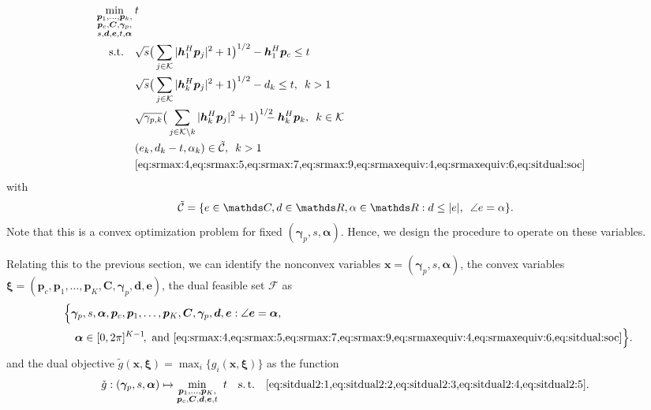 \documentclass[a4paper,10pt,journal]{IEEEtran}
\let\vec\bm
\begin{document}
\begin{subequations} \label{eq:sitdual2}
	\begin{align}
		\min_{\mathclap{\substack{\vec p_1, \dots, \vec p_k,\\\vec p_c,  \vec C, \vec \gamma_p,\\ s, \vec d, \vec e, t, \vec\alpha}}}\quad & t \\
	\mbox{s.t.}\quad
%
	& \sqrt{s} \big( \sum\limits_{j\in\mathcal{K}}|\vec{h}_{1}^{H}\vec{p}_{j}|^2+1 \big)^{1/2} - {\vec{h}}_{1}^{H}\vec{p}_{c} \le t \label{eq:sitdual2:1}\\
	& \sqrt{s} \big( \sum\limits_{j\in\mathcal{K}}|\vec{h}_{k}^{H}\vec{p}_{j}|^2+1 \big)^{1/2} - d_k \le t,\enskip k > 1 \label{eq:sitdual2:2}\\
	& \sqrt{\gamma_{p,k}} \big( \sum\limits_{j\in\mathcal{K}\setminus k}|\vec{h}_{k}^{H}\vec{p}_{j}|^2+1 \big)^{1/2}\!\!\!\!\! - {\vec{h}}_{k}^{H}\vec{p}_{k},\enskip k\in\mathcal K \label{eq:sitdual2:3}\\
	& (e_k, d_k - t, \alpha_k)\in\tilde{\mathcal C},\enskip k > 1 \label{eq:sitdual2:4} \\
	& \text{\cref{eq:srmax:4,eq:srmax:5,eq:srmax:7,eq:srmax:9,eq:srmaxequiv:4,eq:srmaxequiv:6,eq:sitdual:soc}} \label{eq:sitdual2:5}
	\end{align}
\end{subequations}
with
\begin{equation}
	\tilde{\mathcal C} = \{ e\in\mathds C, d \in \mathds R, \alpha \in\mathds R : d  \le | e |,\enskip \angle e = \alpha \}.
\end{equation}
Note that this is a convex optimization problem for fixed $(\vec\gamma_p, s, \vec\alpha)$. Hence, we design the  procedure to operate on these variables.

Relating this to the previous section, we can identify the nonconvex variables $\vec x = (\vec\gamma_p, s, \vec\alpha)$, the convex variables $\vec\xi = (\vec p_c, \vec p_1, \dots, \vec p_K, \vec C, \vec\gamma_p, \vec d, \vec e)$, the dual feasible set $\mathcal F$ as
\begin{equation} \label{eq:sitf}
	\begin{aligned}
	&\Big\{ \vec\gamma_p, s, \vec \alpha, \vec p_c, \vec p_1, \dots, \vec p_K, \vec C, \vec\gamma_p, \vec d, \vec e :
		\angle\vec e = \vec\alpha,\\
	&	\quad\vec\alpha\in[0, 2\pi]^{K-1}\!,
	\text{ and \cref{eq:srmax:4,eq:srmax:5,eq:srmax:7,eq:srmax:9,eq:srmaxequiv:4,eq:srmaxequiv:6,eq:sitdual:soc}} \mathrlap{\Big\}.}\enskip
	\end{aligned}
\end{equation}
and the dual objective $\tilde g(\vec x, \vec\xi) = \max_i\{ g_i(\vec x, \vec\xi) \}$ as the function
\begin{equation} \label{eq:sitg}
		\tilde g : (\vec\gamma_p, s, \vec\alpha) \mapsto \min_{\substack{\vec p_1, \dots, \vec p_K,\\ \vec p_c, \vec C, \vec d, \vec e, t}}\  t
		\quad\mathrm{s.\,t.}\quad
		\text{\cref{eq:sitdual2:1,eq:sitdual2:2,eq:sitdual2:3,eq:sitdual2:4,eq:sitdual2:5}}.
\end{equation}
\end{document}
